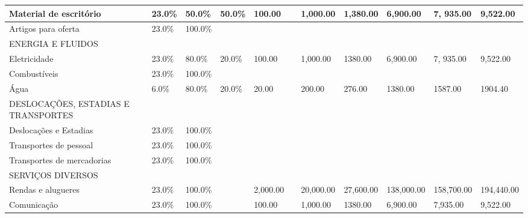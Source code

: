 \documentclass[11pt]{article}
\begin{document}
\begin{adjustbox}{center}
\begin{tabular}{|l|l|l|l|l|l|l|l|l|l|l|}
			Material de escritório                      & 23.0\%   & 50.0\%  & 50.0\% & 100.00       &      & 1,000.00  & 1,380.00  & 6,900.00   & 7, 935.00  & 9,522.00   \\ \hline
			Artigos para oferta                         & 23.0\%   & 100.0\% &        &              &      &           &           &            &            &            \\ \hline
			ENERGIA E FLUIDOS                           &          &         &        &              &      &           &           &            &            &            \\ \hline
			Eletricidade                                & 23.0\%   & 80.0\%  & 20.0\% & 100.00       &      & 1,000.00  & 1380.00   & 6,900.00   & 7, 935.00  & 9,522.00   \\ \hline
			Combustíveis                                & 23.0\%   & 100.0\% &        &              &      &           &           &            &            &            \\ \hline
			Água                                        & 6.0\%    & 80.0\%  & 20.0\% & 20.00        &      & 200.00    & 276.00    & 1380.00    & 1587.00    & 1904.40    \\ \hline
			DESLOCAÇÕES, ESTADIAS E TRANSPORTES          &          &         &        &              &      &           &           &            &            &            \\ \hline
			Deslocações e Estadias                       & 23.0\%   & 100.0\% &        &              &      &           &           &            &            &            \\ \hline
			Transportes de pessoal                      & 23.0\%   & 100.0\% &        &              &      &           &           &            &            &            \\ \hline
			Transportes de mercadorias                  & 23.0\%   & 100.0\% &        &              &      &           &           &            &            &            \\ \hline
			SERVIÇOS DIVERSOS                          &          &         &        &              &      &           &           &            &            &            \\ \hline
			Rendas e alugueres                          & 23.0\%   & 100.0\% &        & 2,000.00     &      & 20,000.00 & 27,600.00 & 138,000.00 & 158,700.00 & 194,440.00 \\ \hline
			Comunicação                                 & 23.0\%   & 100.0\% &        & 100.00       &      & 1,000.00  & 1380.00   & 6,900.00   & 7,935.00   & 9,522.00   \\ \hline

\end{tabular}
\end{adjustbox}
\end{document}
